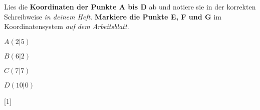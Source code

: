 \begin{aufgabe}[subtitle=Punkte im Koordinatensystem]
	\begin{teilaufgaben}
		\teilaufgabe Lies die \textbf{Koordinaten der Punkte A bis D} ab und notiere sie in der korrekten Schreibweise \textit{in deinem Heft}.
		\teilaufgabe \textbf{Markiere die Punkte E, F und G} im Koordinatensystem \textit{auf dem Arbeitsblatt}. \begin{center}
			\begin{koordinatensystemNO}[5mm]{13}{13}
			\end{koordinatensystemNO}\end{center}
	\end{teilaufgaben}

	\begin{loesung}
		\begin{teilaufgaben}
			\teilaufgabe \begin{multicols}{2}
				\begin{smallitemize}
					\item[] $A(2|5)$
					\item[] $B(6|2)$
					\item[] $C(7|7)$
					\item[] $D(10|0)$
				\end{smallitemize}
			\end{multicols}
			\teilaufgabe \begin{center}
				\begin{koordinatensystemNO}[5mm]{13}{13}
					\Punkt{4,9}{E}
					\Punkt{0,11}{F}
					\Punkt{1.5,10.5}{G}
			\end{koordinatensystemNO}\end{center}
		\end{teilaufgaben}
	\end{loesung}

	\begin{erwartungen}
		[1]
	\end{erwartungen}
\end{aufgabe}